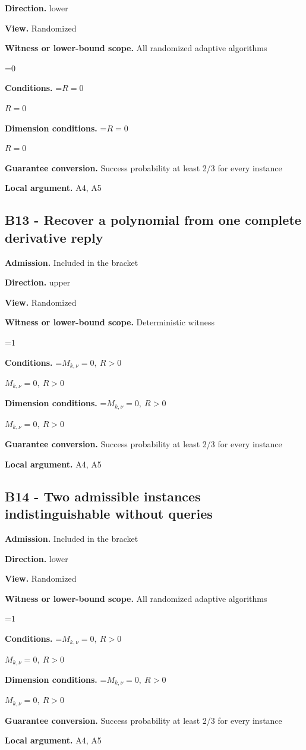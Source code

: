 \documentclass[10pt,a4paper]{article}
\newcommand{\AtlasMath}[1]{\par\begingroup\centering\setbox0=\hbox{$\displaystyle #1$}\ifdim\wd0>1.4\linewidth\typeout{ATLAS WIDE FORMULA: \the\wd0}\fi\ifdim\wd0>\linewidth\resizebox{\linewidth}{!}{\box0}\else\box0\fi\par\endgroup}
\newcommand{\AtlasInlineMath}[1]{\begingroup\setbox0=\hbox{$#1$}\ifdim\wd0>.4\linewidth\endgroup\AtlasMath{#1}\else\endgroup$#1$\fi}
\begin{document}
\textbf{Direction.} lower

\textbf{View.} Randomized

\textbf{Witness or lower-bound scope.} All randomized adaptive algorithms

\AtlasMath{0}
\textbf{Conditions.} \AtlasInlineMath{R=0}

\textbf{Dimension conditions.} \AtlasInlineMath{R=0}

\textbf{Guarantee conversion.} Success probability at least 2/3 for every instance

\textbf{Local argument.} A4, A5

\subsection{B13 - Recover a polynomial from one complete derivative reply}
\textbf{Admission.} Included in the bracket

\textbf{Direction.} upper

\textbf{View.} Randomized

\textbf{Witness or lower-bound scope.} Deterministic witness

\AtlasMath{1}
\textbf{Conditions.} \AtlasInlineMath{M_{k,\nu}=0,\ R>0}

\textbf{Dimension conditions.} \AtlasInlineMath{M_{k,\nu}=0,\ R>0}

\textbf{Guarantee conversion.} Success probability at least 2/3 for every instance

\textbf{Local argument.} A4, A5

\subsection{B14 - Two admissible instances indistinguishable without queries}
\textbf{Admission.} Included in the bracket

\textbf{Direction.} lower

\textbf{View.} Randomized

\textbf{Witness or lower-bound scope.} All randomized adaptive algorithms

\AtlasMath{1}
\textbf{Conditions.} \AtlasInlineMath{M_{k,\nu}=0,\ R>0}

\textbf{Dimension conditions.} \AtlasInlineMath{M_{k,\nu}=0,\ R>0}

\textbf{Guarantee conversion.} Success probability at least 2/3 for every instance

\textbf{Local argument.} A4, A5
\end{document}
